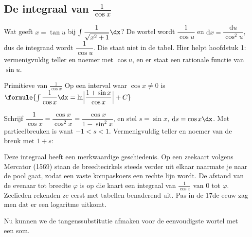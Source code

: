 \subsection{De integraal van \texorpdfstring{$\frac{1}{\cos x}$}{1/cos x}}

Wat geeft $x = \tan u$ bij $\int \dfrac{1}{\sqrt{x^2 + 1}}\dx$? De wortel wordt $\dfrac{1}{\cos u}$ en $\mathrm{d}x = \dfrac{\mathrm{d}u}{\cos^2 u}$, dus de integrand wordt $\dfrac{1}{\cos u}$. Die staat niet in de tabel. Hier helpt hoofdstuk 1: vermenigvuldig teller en noemer met $\cos u$, en er staat een rationale functie van $\sin u$.

\begin{theorie}
\begin{stelling}{Primitieve van $\frac{1}{\cos x}$}
Op een interval waar $\cos x \neq 0$ is \qquad $\formule{\int \dfrac{1}{\cos x}\dx = \ln\Bigl|\dfrac{1 + \sin x}{\cos x}\Bigr| + C}$
\end{stelling}

\begin{bewijs}
Schrijf $\dfrac{1}{\cos x} = \dfrac{\cos x}{\cos^2 x} = \dfrac{\cos x}{1 - \sin^2 x}$, en stel $s = \sin x$, $\mathrm{d}s = \cos x\dx$. Met partieelbreuken is
want $-1 < s < 1$. Vermenigvuldig teller en noemer van de breuk met $1 + s$:
\end{bewijs}
\end{theorie}

Deze integraal heeft een merkwaardige geschiedenis. Op een zeekaart volgens Mercator (1569) staan de breedtecirkels steeds verder uit elkaar naarmate je naar de pool gaat, zodat een vaste kompaskoers een rechte lijn wordt. De afstand van de evenaar tot breedte $\varphi$ is op die kaart een integraal van $\tfrac{1}{\cos x}$ van 0 tot $\varphi$. Zeelieden rekenden ze eerst met tabellen benaderend uit. Pas in de 17de eeuw zag men dat er een logaritme uitkomt.

Nu kunnen we de tangenssubstitutie afmaken voor de eenvoudigste wortel met een som.

